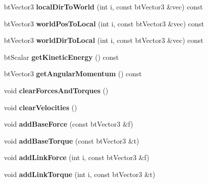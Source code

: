 \begin{DoxyCompactItemize}
bt\+Vector3 {\bfseries local\+Dir\+To\+World} (int i, const bt\+Vector3 \&vec) const
\item 
\mbox{\label{classbtMultiBody_af3ea3389096463994058688eebfdd596}} 
bt\+Vector3 {\bfseries world\+Pos\+To\+Local} (int i, const bt\+Vector3 \&vec) const
\item 
\mbox{\label{classbtMultiBody_a6c922a1a02409d8790f00c58019b1f41}} 
bt\+Vector3 {\bfseries world\+Dir\+To\+Local} (int i, const bt\+Vector3 \&vec) const
\item 
\mbox{\label{classbtMultiBody_a42a042eba0b18e4f0d8b868d6dc23e8b}} 
bt\+Scalar {\bfseries get\+Kinetic\+Energy} () const
\item 
\mbox{\label{classbtMultiBody_acff3d6a623c306ce91cdd007fff0ed23}} 
bt\+Vector3 {\bfseries get\+Angular\+Momentum} () const
\item 
\mbox{\label{classbtMultiBody_aff9f8aa773319219146b7f1aa5849e8e}} 
void {\bfseries clear\+Forces\+And\+Torques} ()
\item 
\mbox{\label{classbtMultiBody_a504c9eb4bba7d799b76b3a5c2e59a2c1}} 
void {\bfseries clear\+Velocities} ()
\item 
\mbox{\label{classbtMultiBody_af485aabee052a04aafab737ed6d45c09}} 
void {\bfseries add\+Base\+Force} (const bt\+Vector3 \&f)
\item 
\mbox{\label{classbtMultiBody_a57545c47299f1a3ec305461e6ec6b5c4}} 
void {\bfseries add\+Base\+Torque} (const bt\+Vector3 \&t)
\item 
\mbox{\label{classbtMultiBody_a7c3897d0dc78fae74b1f665349596713}} 
void {\bfseries add\+Link\+Force} (int i, const bt\+Vector3 \&f)
\item 
\mbox{\label{classbtMultiBody_a6fca672a0de1e44a828e2ed2b2bfca3b}} 
void {\bfseries add\+Link\+Torque} (int i, const bt\+Vector3 \&t)
\item 
\mbox{\label{classbtMultiBody_a7c55a0935f2bcc58863c9d6724f3976a}} 

\end{DoxyCompactItemize}
